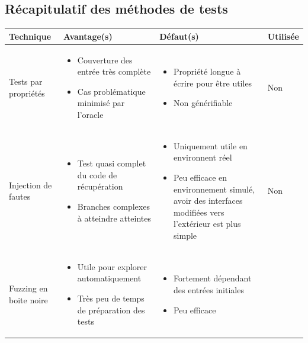 \documentclass[a4paper]{report}
\begin{document}
\begin{landscape}
	\section{Récapitulatif des méthodes de tests}
	\begin{tabularx}{1\linewidth}{>{\centering}p{}||p{}|p{}|p{}}
	Technique & Avantage(s) & Défaut(s) & 
	Utilisée  \\
	\hline 
	\hline   
	Tests par propriétés & 
	\begin{itemize}
	\item Couverture des entrée très complète
	\item Cas problématique minimisé par l'oracle
	\end{itemize}
	 &
	\begin{itemize}
	\item Propriété longue à écrire pour être utiles
	\item Non générifiable
	\end{itemize}
	 & Non \\ 
	\hline   
	Injection de fautes &
	\begin{itemize}
	\item Test quasi complet du code de récupération
	\item Branches complexes à atteindre atteintes
	\end{itemize}
	 &
	\begin{itemize}
	\item Uniquement utile en environnent réel
	\item Peu efficace en environnement simulé, avoir des interfaces modifiées vers l'extérieur est plus simple
	\end{itemize}
	 & Non \\ 
	\hline   
	Fuzzing en boite noire &
	\begin{itemize}
	\item Utile pour explorer  automatiquement
	\item Très peu de temps de préparation des tests
	\end{itemize}
	 & 
	\begin{itemize}
	\item Fortement dépendant des entrées initiales
	\item Peu efficace

\end{itemize}
\end{tabularx}
\end{landscape}
\end{document}
